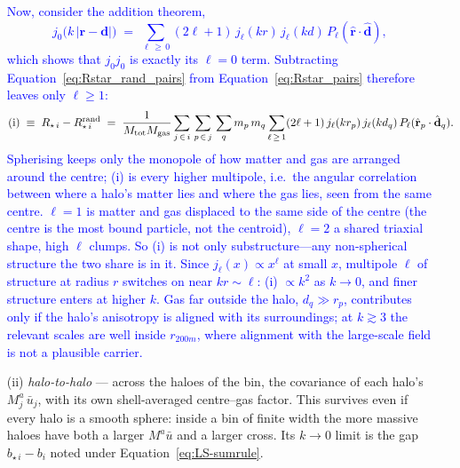 \documentclass{article}
\begin{document}
\begin{itemize}
  \textcolor{blue}{Now, consider the addition theorem,
  \begin{equation}
    j_0\big(k\,|\mathbf r - \mathbf d|\big) \;=\; \sum_{\ell\,\ge\,0}(2\ell+1)\,
    j_\ell(kr)\,j_\ell(kd)\,P_\ell(\hat{\mathbf r}\cdot\hat{\mathbf d}),
  \end{equation}
  which shows that $j_0 j_0$ is exactly its $\ell = 0$ term. Subtracting
  Equation~\eqref{eq:Rstar_rand_pairs} from Equation~\eqref{eq:Rstar_pairs}
  therefore leaves only $\ell\ge1$:
  \begin{equation}
    \text{(i)} \;\equiv\; R_{\star\,i} - R_{\star\,i}^{\rm rand} \;=\; \frac{1}{M_{\rm tot}M_{\rm gas}}\sum_{j\,\in\,i}\,
    \sum_{p\,\in\,j}\,\sum_q m_p\,m_q \sum_{\ell\,\ge\,1}(2\ell+1)\,
    j_\ell(k r_p)\,j_\ell(k d_q)\,P_\ell(\hat{\mathbf r}_p\cdot\hat{\mathbf d}_q).
    \label{eq:intra_multipoles}
  \end{equation}
  Spherising keeps only the monopole of how matter and gas are arranged around
  the centre; (i) is every higher multipole, i.e.\ the angular correlation
  between where a halo's matter lies and where the gas lies, seen from the same
  centre. $\ell = 1$ is matter and gas displaced to the same side of the centre
  (the centre is the most bound particle, not the centroid), $\ell = 2$ a shared
  triaxial shape, high $\ell$ clumps. So (i) is not only substructure---any
  non-spherical structure the two share is in it. Since $j_\ell(x)\propto x^\ell$ at small $x$, multipole $\ell$ of
  structure at radius $r$ switches on near $kr\sim\ell$: (i) $\propto k^2$ as
  $k\to0$, and finer structure enters at higher $k$. Gas far outside the halo,
  $d_q \gg r_p$, contributes only if the halo's anisotropy is aligned with its
  surroundings; at $k \gtrsim 3$ the relevant scales are well inside
  $r_{200m}$, where alignment with the large-scale field is not a plausible
  carrier.}

  \item[(ii)] \emph{halo-to-halo} --- across the haloes of the bin, the
  covariance of each halo's $M_j^a\,\bar u_j$,
  with its own shell-averaged centre--gas factor. This survives even if every
  halo is a smooth sphere: inside a bin of finite width the more massive haloes
  have both a larger $M^a \bar u$ and a larger cross. Its $k\to0$ limit is the
  gap $b_{\star\,i} - b_i$ noted under Equation~\eqref{eq:LS-sumrule}.


\end{itemize}
\end{document}
